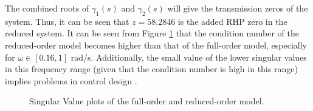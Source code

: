 The combined roots of $\gamma_1(s)$ and $\gamma_2(s)$ will give the transmission zeros of the system. Thus, it can be seen that $z = 58.2846$ is the added RHP zero in the reduced system. It can be seen from Figure \ref{fig:ssvFullRed} that the condition number of the reduced-order model becomes higher than that of the full-order model, especially for $\omega \in [0.16,1]$ rad/s. Additionally, the small value of the lower singular values in this frequency range (given that the condition number is high in this range) implies problems in control design \cite{Sko05}.

\begin{figure}[h!]
    \centering
    \scalebox{0.7}{
    \begin{tikzpicture}
        
    \end{tikzpicture}}
    \caption{Singular Value plots of the full-order and reduced-order model.}
    \label{fig:ssvFullRed}
\end{figure}